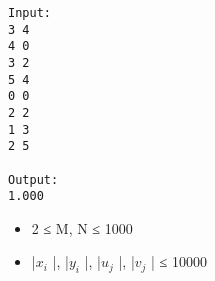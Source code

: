 \begin{verbatim}
Input:
3 4
4 0
3 2
5 4
0 0
2 2
1 3
2 5

Output:
1.000
\end{verbatim}
\begin{itemize}
	\item     2 ≤ M, N ≤ 1000   
	\item     |$x_{i}$    |, |$y_{i}$    |, |$u_{j}$    |, |$v_{j}$    | ≤ 10000   
\end{itemize}